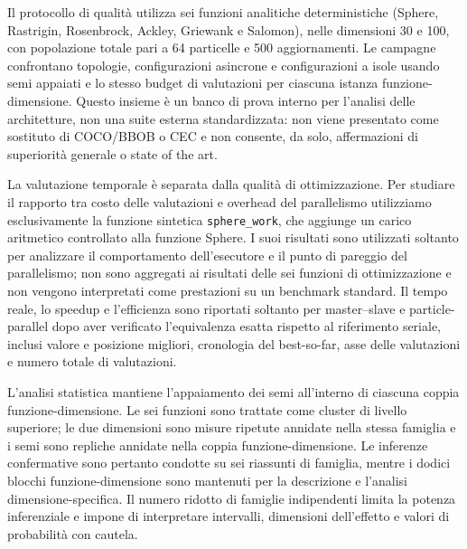 Il protocollo di qualità utilizza sei funzioni analitiche deterministiche (Sphere, Rastrigin, Rosenbrock, Ackley, Griewank e Salomon), nelle dimensioni 30 e 100, con popolazione totale pari a 64 particelle e 500 aggiornamenti. Le campagne confrontano topologie, configurazioni asincrone e configurazioni a isole usando semi appaiati e lo stesso budget di valutazioni per ciascuna istanza funzione-dimensione. Questo insieme è un banco di prova interno per l'analisi delle architetture, non una suite esterna standardizzata: non viene presentato come sostituto di COCO/BBOB o CEC e non consente, da solo, affermazioni di superiorità generale o state of the art.

La valutazione temporale è separata dalla qualità di ottimizzazione. Per studiare il rapporto tra costo delle valutazioni e overhead del parallelismo utilizziamo esclusivamente la funzione sintetica \texttt{sphere\_work}, che aggiunge un carico aritmetico controllato alla funzione Sphere. I suoi risultati sono utilizzati soltanto per analizzare il comportamento dell'esecutore e il punto di pareggio del parallelismo; non sono aggregati ai risultati delle sei funzioni di ottimizzazione e non vengono interpretati come prestazioni su un benchmark standard. Il tempo reale, lo speedup e l'efficienza sono riportati soltanto per master--slave e particle-parallel dopo aver verificato l'equivalenza esatta rispetto al riferimento seriale, inclusi valore e posizione migliori, cronologia del best-so-far, asse delle valutazioni e numero totale di valutazioni.

L'analisi statistica mantiene l'appaiamento dei semi all'interno di ciascuna coppia funzione-dimensione. Le sei funzioni sono trattate come cluster di livello superiore; le due dimensioni sono misure ripetute annidate nella stessa famiglia e i semi sono repliche annidate nella coppia funzione-dimensione. Le inferenze confermative sono pertanto condotte su sei riassunti di famiglia, mentre i dodici blocchi funzione-dimensione sono mantenuti per la descrizione e l'analisi dimensione-specifica. Il numero ridotto di famiglie indipendenti limita la potenza inferenziale e impone di interpretare intervalli, dimensioni dell'effetto e valori di probabilità con cautela.

